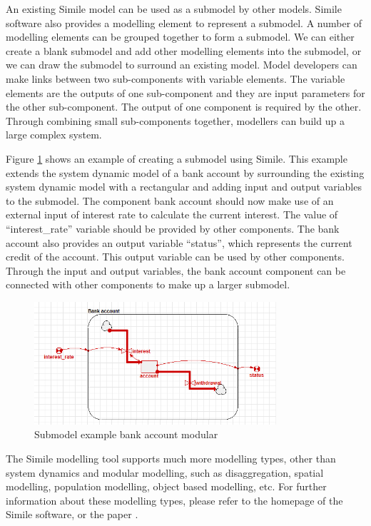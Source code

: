\par
An existing Simile model can be used as a submodel by other models. Simile software also provides a modelling element to represent a submodel.  A number of modelling elements can be grouped together to form a submodel. We can either create a blank submodel and add other modelling elements into the submodel, or we can draw the submodel to surround an existing model. Model developers can make links between two sub-components with variable elements. The variable elements are the outputs of one sub-component and they are input parameters for the other sub-component. The output of one component is required by the other. Through combining small sub-components together, modellers can build up a large complex system.
\par
Figure \ref{fig:simile_example_submodel} shows an example of creating a submodel using Simile. This example extends the system dynamic model of a bank account by surrounding the existing system dynamic model with a rectangular and adding input and output variables to the submodel. The component bank account should now make use of an external input of interest rate to calculate the current interest. The value of ``interest\_rate'' variable should be provided by other components. The bank account also provides an output variable ``status'', which represents the current credit of the account. This output variable can be used by other components. Through the input and output variables, the bank account component can be connected with other components to make up a larger submodel.
\begin{figure}[h]
	\centering
	\includegraphics[width=0.8\textwidth]{pics/simile/simile_example_submodel.png}
	\caption{Submodel example bank account modular \label{fig:simile_example_submodel}}	
\end{figure}
\par
The Simile modelling tool supports much more modelling types, other than system dynamics and modular modelling, such as disaggregation, spatial modelling, population modelling, object based modelling, etc. For further information about these modelling types, please refer to the homepage of the Simile software, or the paper \autocite{dsl:simile-know}.
